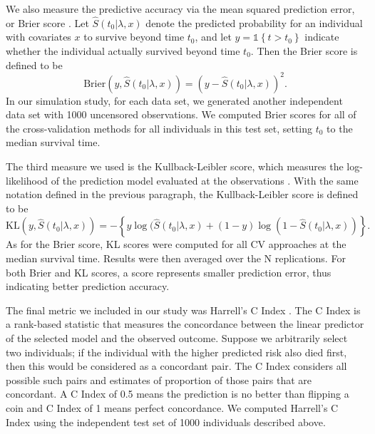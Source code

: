 \par We also measure the predictive accuracy via the mean squared prediction error, or Brier score \citep{VanHouwelingen2011}. Let $\hat{S}(t_0|\lambda,x)$ denote the predicted probability for an individual with covariates $x$ to survive beyond time $t_0$, and let $y = \mathbb{1}\left\{ t > t_{0}\right\}$ indicate whether the individual actually survived beyond time $t_0$. Then the Brier score is defined to be
\begin{equation}
\text{Brier}(y, \hat{S}(t_0|\lambda,x)) = (y - \hat{S}(t_0|\lambda,x))^2.
\end{equation}
In our simulation study, for each data set, we generated another independent data set with 1000 uncensored observations. We computed Brier scores for all of the cross-validation methods for all individuals in this test set, setting $t_0$ to the median survival time.

\par The third measure we used is the Kullback-Leibler score, which measures the log-likelihood of the prediction model evaluated at the observations \citep{VanHouwelingen2011}. With the same notation defined in the previous paragraph, the Kullback-Leibler score is defined to be
\begin{equation}
	\text{KL}(y, \hat{S}(t_0|\lambda,x)) = -\left\{ y\log(\hat{S}(t_0|\lambda,x) + (1 - y)\log(1 - \hat{S}(t_0|\lambda,x)) \right\}.
\end{equation}
As for the Brier score, KL scores were computed for all CV approaches at the median survival time.  Results were then averaged over the N replications. For both Brier and KL scores, a score represents smaller prediction error, thus indicating better prediction accuracy.

\par The final metric we included in our study was Harrell's C Index \citep{HarrellJr1984}. The C Index is a rank-based statistic that measures the concordance between the linear predictor of the selected model and the observed outcome. Suppose we arbitrarily select two individuals; if the individual with the higher predicted risk also died first, then this would be considered as a concordant pair. The C Index considers all possible such pairs and estimates of proportion of those pairs that are concordant. A C Index of 0.5 means the prediction is no better than flipping a coin and C Index of 1 means perfect concordance. We computed Harrell's C Index using the independent test set of 1000 individuals described above.

